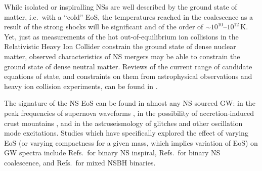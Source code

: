 While isolated or inspiralling NSs are well described by the
ground state of matter, i.e.\  with a ``cold'' EoS, the
temperatures reached in the coalescence as a result of the strong
shocks will be significant and of the order of $\sim 10^{10}$--$10^{12}$\,K. 
Yet, just as measurements of the hot out-of-equilibrium ion
collisions in the Relativistic Heavy Ion Collider 
constrain the ground state of dense nuclear matter,
observed characteristics of NS mergers may be able to
constrain the ground state of dense neutral matter.
Reviews of the current range of candidate equations of state, 
and constraints on them from astrophysical observations and 
heavy ion collision experiments, can be found in 
\cite{LattimerPrakash2007,Klahn2006,PageReddy2006}.

The signature of the NS EoS can be found in almost any
NS sourced GW: in the peak frequencies of
supernova waveforms \cite{Dimmelmeier2007,Marek2008}, in the
possibility of accretion-induced crust mountains \cite{Owen05,
Watts2008}, and in the astroseismology of glitches and other
oscillation mode excitations.  Studies which have specifically
explored the effect of varying EoS (or varying compactness for a given
mass, which implies variation of EoS) on GW spectra
include Refs.\,\cite{ZhugeEt1996, RasioShapiro1999, FlanaganHinderer2007,
Read:2008pp, Read:2009bns} for binary NS inspiral,
Refs.\,\cite{Bejger05,Shibata05c,Shibata2005eos, Oechslin06,Oechslin07b,
Yamamoto2008,Baiotti08,Baiotti:2009gk} for binary NS
coalescence, and Refs.\,\cite{Faber05,LattimerPrakash2007,
ShibataTaniguchi2008,Shibata:2009cn} for mixed
NSBH binaries.  

